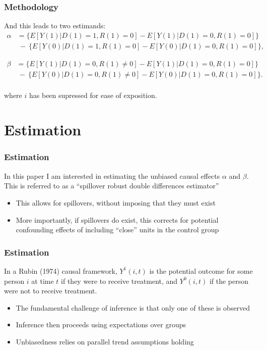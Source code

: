 \documentclass[10pt,letterpaper,subeqn]{beamer}
\begin{document}
\begin{frame}[label=method4]
  \frametitle{Methodology}
And this leads to two estimands:
\begin{eqnarray}
\nonumber
\label{Seqn:DDa}
\alpha&=\{E[Y(1)|D(1)=1,R(1)=0]-E[Y(1)|D(1)=0,R(1)=0]\} \\ \nonumber
      &\ -\ \{E[Y(0)|D(1)=1,R(1)=0]-E[Y(0)|D(1)=0,R(1)=0]\}, 
\end{eqnarray}

\begin{eqnarray}
\nonumber
\beta&=\{E[Y(1)|D(1)=0,R(1)\neq 0]-E[Y(1)|D(1)=0,R(1)=0]\} \\ \nonumber
      &\ -\ \{E[Y(0)|D(1)=0,R(1)\neq 0]-E[Y(0)|D(1)=0,R(1)=0]\}. 
\end{eqnarray}
\vspace{3mm} \\
where $i$ has been supressed for ease of exposition.
\end{frame}

\section{Estimation}
\begin{frame}[label=estim1]
  \frametitle{Estimation}
In this paper I am interested in estimating the unbiased causal effects $\alpha$ 
and $\beta$.  This is referred to as a ``spillover robust double differences
estimator''
\vspace{4mm}
\begin{itemize}
\item This allows for spillovers, without imposing that they must exist
\item More importantly, if spillovers do exist, this corrects for potential 
confounding effects of including ``close'' units in the control group
\end{itemize}
\end{frame}

\begin{frame}[label=estim2]
  \frametitle{Estimation}
In a Rubin (1974) causal framework, $Y^1(i,t)$ is the potential outcome for some 
person $i$ at time $t$ if they were to receive treatment, and $Y^0(i,t)$ if the 
person were not to receive treatment.
\vspace{4mm}
\begin{itemize}
\item The fundamental challenge of inference is that only one of these is observed
\item Inference then proceeds using expectations over groups
\item Unbiasedness relies on parallel trend assumptions holding
\end{itemize}
\end{frame}
\end{document}
